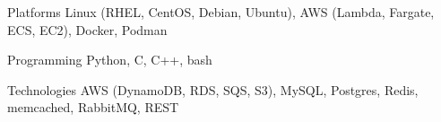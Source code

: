 

\begin{cvskills}

  \cvskill
    {Platforms} %
    {Linux (RHEL, CentOS, Debian, Ubuntu), AWS (Lambda, Fargate, ECS, EC2), Docker, Podman}

  \cvskill
    {Programming} %
    {Python, C, C++, bash} %

  \cvskill
    {Technologies} %
    {AWS (DynamoDB, RDS, SQS, S3), MySQL, Postgres, Redis, memcached, RabbitMQ, REST} %


\end{cvskills}
